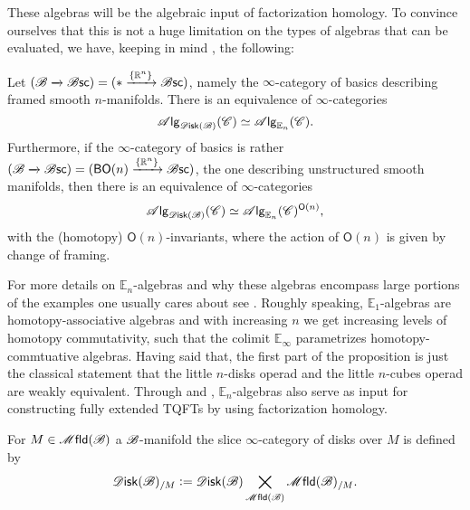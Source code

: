 \documentclass[../text]{subfiles}
\begin{document}
These algebras will be the algebraic input of factorization homology. To convince ourselves that this is not a huge limitation on the types of algebras that can be evaluated, we have, keeping in mind , the following:
%
\begin{proposition}\label{prop:framed_ndisk=En}
    Let $(\mathscr{B} \xrightarrow{} \mathscr{B} \mathsf{sc}) = (* \xrightarrow{\{ \mathbb{R}^n\}} \mathscr{B} \mathsf{sc})$, namely the $\infty$-category of basics describing framed smooth $n$-manifolds. There is an equivalence of $\infty$-categories
    \begin{equation}
        \alg{\disk(\bstr)} (\catC) \simeq \alg{\mathbb{E}_n} (\catC).
    \end{equation}
    Furthermore, if the $\infty$-category of basics is rather $(\mathscr{B} \xrightarrow{} \mathscr{B} \mathsf{sc}) = (\mathsf{BO}(n) \xrightarrow{\{ \mathbb{R}^n\}} \mathscr{B} \mathsf{sc})$, the one describing unstructured smooth manifolds, then there is an equivalence of $\infty$-categories
    \begin{equation}
        \alg{\disk(\bstr)} (\catC) \simeq \alg{\mathbb{E}_n}(\catC)^{\mathsf{O}(n)},
    \end{equation}
    with the (homotopy) $\mathsf{O}(n)$-invariants, where the action of $\mathsf{O}(n)$ is given by change of framing.
\end{proposition}

\begin{remark}
    For more details on $\mathbb{E}_n$-algebras and why these algebras encompass large portions of the examples one usually cares about see \cite[§5.1]{lurie_ha}. %
    Roughly speaking, $\mathbb{E}_1$-algebras are homotopy-associative algebras and with increasing $n$ we get increasing levels of homotopy commutativity, such that the colimit $\mathbb{E}_\infty$ parametrizes homotopy-commtuative algebras. Having said that, the first part of the proposition is just the classical statement that the little $n$-disks operad and the little $n$-cubes operad are weakly equivalent. Through \cite{lurie_tqft} and \cite{scheimbauer2014}, $\mathbb{E}_n$-algebras also serve as input for constructing fully extended TQFTs by using factorization homology.
\end{remark}


\begin{definition}
    For $M \in \mfld(\bstr)$ a $\mathscr{B}$-manifold the slice $\infty$-category of disks over $M$ is defined by
    \begin{equation}
        \disk(\bstr)_{/M} := \disk(\bstr) \bigtimes\limits_{\mfld(\bstr)} \mfld(\bstr)_{/M}.
    \end{equation}
\end{definition}
\end{document}

